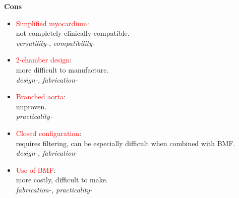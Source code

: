 \begin{minipage}[t]{0.5\textwidth}
\centering\textbf{Cons}
\begin{itemize} [noitemsep]
	\item \textcolor{red}{Simplified myocardium}: \\ not completely clinically compatible. \\ \textit{versatility-, compatibility-}
	\item \textcolor{red}{2-chamber design}: \\ more difficult to manufacture. \\ \textit{design-, fabrication-}
	\item \textcolor{red}{Branched aorta}: \\ unproven. \\ \textit{practicality-}
	\item \textcolor{red}{Closed configuration}: \\ requires filtering, can be especially difficult when combined with BMF. \\ \textit{design-, fabrication-}
	\item \textcolor{red}{Use of BMF}: \\ more costly, difficult to make. \\ \textit{fabrication-, practicality-}
\end{itemize}
\end{minipage}

